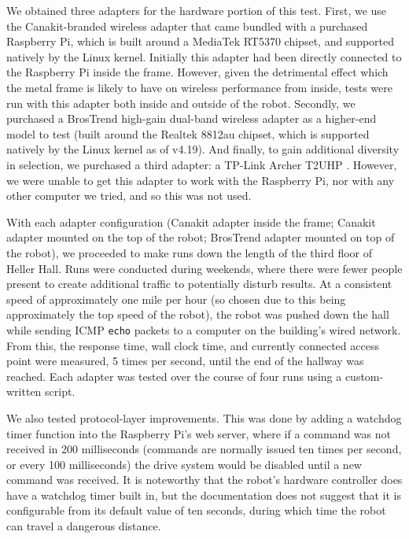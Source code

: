 \documentclass{IEEEtran}
\begin{document}
We obtained three adapters for the hardware portion of this test. First, we
use the Canakit-branded wireless adapter that came bundled with a purchased
Raspberry Pi\cite{canakit}, which is built around a MediaTek RT5370 chipset,
and supported natively by the Linux kernel. Initially this adapter had been
directly connected to the Raspberry Pi inside the frame. However, given the
detrimental effect which the metal frame is likely to have on wireless 
performance from inside, tests were run with this adapter both inside and
outside of the robot. Secondly, we purchased a BrosTrend high-gain dual-band
wireless adapter as a higher-end model to test\cite{brostrend} (built around
the Realtek 8812au chipset, which is supported natively by the Linux kernel
as of v4.19). And finally, to gain additional diversity in selection, we
purchased a third adapter: a TP-Link Archer T2UHP \cite{archer}. However,
we were unable to get this adapter to work with the Raspberry Pi, nor with
any other computer we tried, and so this was not used.

With each adapter configuration (Canakit adapter inside the frame; Canakit
adapter mounted on the top of the robot; BrosTrend adapter mounted on top
of the robot), we proceeded to make runs down the length of the third
floor of Heller Hall. Runs were conducted during weekends, where there were
fewer people present to create additional traffic to potentially disturb
results. At a consistent speed of approximately one mile per hour (so chosen
due to this being approximately the top speed of the robot), the robot was
pushed down the hall while sending ICMP \texttt{echo} packets to a computer
on the building's wired network. From this, the response time, wall clock
time, and currently connected access point were measured, 5 times per second,
until the end of the hallway was reached. Each adapter was tested over the
course of four runs using a custom-written script\cite{hallway-script}.

We also tested protocol-layer improvements. This was done by adding a
watchdog timer function\cite{watchdog} into the Raspberry Pi's web server,
where if a command was not received in 200 milliseconds (commands are
normally issued ten times per second, or every 100 milliseconds) the drive
system would be disabled until a new command was received. It is noteworthy
that the robot's hardware controller does have a watchdog timer built in, but
the documentation does not suggest that it is configurable from its default
value of ten seconds, during which time the robot can travel a dangerous
distance.
\end{document}
